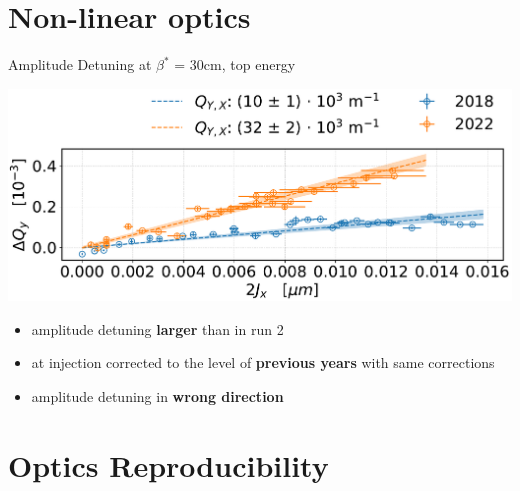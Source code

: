 \documentclass[4pt,usenames,dvipsnames,aspectratio=169,table]{beamer}
\newcommand{\highl}[1]{\textbf{#1}}
\begin{document}
%    
%
%
\section{Non-linear optics}

\begin{frame}{Amplitude Detuning at $\beta^*$ = 30cm, top energy}
    \begin{center}
        \includegraphics[width=0.5\linewidth]{images/nonlinear/comparison_2018_2022_dQYd2JX_corrected.pdf}
    \end{center}
    
    \begin{itemize}
        \item amplitude detuning \highl{larger} than in run 2
        \item at injection corrected to the level of \highl{previous years} with same corrections
        \item amplitude detuning in \highl{wrong direction}
    \end{itemize}
\end{frame}


\section{Optics Reproducibility}
\end{document}
